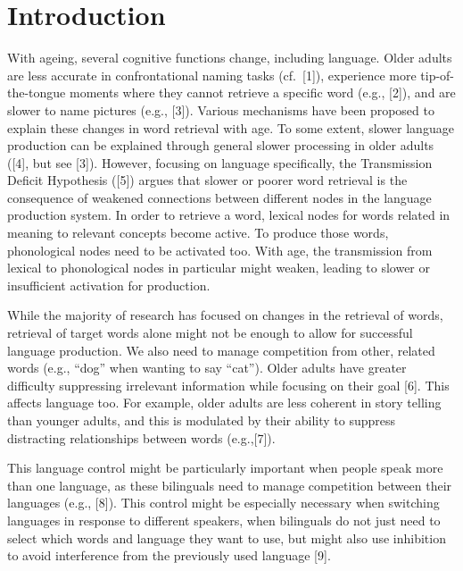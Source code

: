 \documentclass[
]{article}
\begin{document}
\newpage

\hypertarget{introduction}{%
\section{Introduction}\label{introduction}}

With ageing, several cognitive functions change, including language. Older adults are less accurate in confrontational naming tasks (cf.~{[}1{]}), experience more tip-of-the-tongue moments where they cannot retrieve a specific word (e.g., {[}2{]}), and are slower to name pictures (e.g., {[}3{]}). Various mechanisms have been proposed to explain these changes in word retrieval with age. To some extent, slower language production can be explained through general slower processing in older adults ({[}4{]}, but see {[}3{]}). However, focusing on language specifically, the Transmission Deficit Hypothesis ({[}5{]}) argues that slower or poorer word retrieval is the consequence of weakened connections between different nodes in the language production system. In order to retrieve a word, lexical nodes for words related in meaning to relevant concepts become active. To produce those words, phonological nodes need to be activated too. With age, the transmission from lexical to phonological nodes in particular might weaken, leading to slower or insufficient activation for production.

While the majority of research has focused on changes in the retrieval of words, retrieval of target words alone might not be enough to allow for successful language production. We also need to manage competition from other, related words (e.g., ``dog'' when wanting to say ``cat''). Older adults have greater difficulty suppressing irrelevant information while focusing on their goal {[}6{]}. This affects language too. For example, older adults are less coherent in story telling than younger adults, and this is modulated by their ability to suppress distracting relationships between words (e.g.,{[}7{]}).

This language control might be particularly important when people speak more than one language, as these bilinguals need to manage competition between their languages (e.g., {[}8{]}). This control might be especially necessary when switching languages in response to different speakers, when bilinguals do not just need to select which words and language they want to use, but might also use inhibition to avoid interference from the previously used language {[}9{]}.
\end{document}
